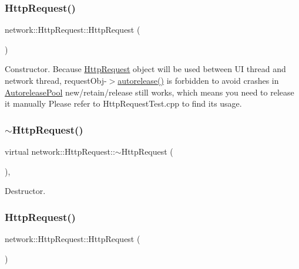 \subsubsection{\texorpdfstring{Http\+Request()}{HttpRequest()}\hspace{0.1cm}{\footnotesize\ttfamily [1/2]}}
{\footnotesize\ttfamily network\+::\+Http\+Request\+::\+Http\+Request (\begin{DoxyParamCaption}{ }\end{DoxyParamCaption})\hspace{0.3cm}{\ttfamily [inline]}}

Constructor. Because \hyperlink{classnetwork_1_1HttpRequest}{Http\+Request} object will be used between UI thread and network thread, request\+Obj-\/$>$\hyperlink{classnetwork_1_1HttpRequest_a0fc06041ec6a34d4f92c786a99a91a33}{autorelease()} is forbidden to avoid crashes in \hyperlink{classAutoreleasePool}{Autorelease\+Pool} new/retain/release still works, which means you need to release it manually Please refer to Http\+Request\+Test.\+cpp to find its usage. \mbox{\label{classnetwork_1_1HttpRequest_aeb9ba7fdc3fef6237d611fc9af752bad}} 
\subsubsection{\texorpdfstring{$\sim$\+Http\+Request()}{~HttpRequest()}\hspace{0.1cm}{\footnotesize\ttfamily [1/2]}}
{\footnotesize\ttfamily virtual network\+::\+Http\+Request\+::$\sim$\+Http\+Request (\begin{DoxyParamCaption}{ }\end{DoxyParamCaption})\hspace{0.3cm}{\ttfamily [inline]}, {\ttfamily [virtual]}}

Destructor. \mbox{\label{classnetwork_1_1HttpRequest_ae2e924419ee17ce1bbc87f0122688bb4}} 
\subsubsection{\texorpdfstring{Http\+Request()}{HttpRequest()}\hspace{0.1cm}{\footnotesize\ttfamily [2/2]}}
{\footnotesize\ttfamily network\+::\+Http\+Request\+::\+Http\+Request (\begin{DoxyParamCaption}{ }\end{DoxyParamCaption})\hspace{0.3cm}{\ttfamily [inline]}}

